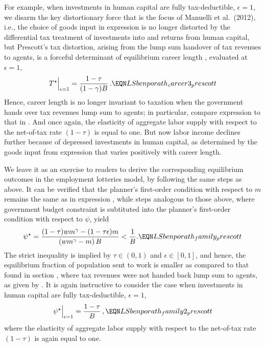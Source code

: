 For example, when investments in human capital are fully tax-deductible,
$\epsilon = 1$, we disarm the key distortionary force that is
the focus of Manuelli et al.\ (2012), i.e., the choice of goods
input in expression  is no longer
distorted by the differential tax treatment of investments into  and returns from human capital, but Prescott's tax distortion, arising from the
lump sum handover of tax revenues to agents, is a forceful determinant
of equilibrium career length ,
evaluated at $\epsilon =1$,
$$
T^{\star} \Big{\vert}_{\epsilon = 1}
 = { 1-\tau \over (1-\gamma )B }\,.
                                        \EQN LSbenporath_career3_prescott
$$
Hence, career length is no longer invariant to taxation when the
government hands over tax revenues lump sum to agents; in particular,
compare expression  to that in
. And once again, the elasticity of aggregate
labor supply with respect to the net-of-tax rate $(1-\tau )$ is equal
to one. But now labor income declines further because of
depressed investments in human capital, as determined by the goods input
from expression  that varies positively
with career length.

We leave it as an exercise to readers to derive the corresponding
equilibrium outcomes in the employment lotteries model, by following
the same steps as above. It can be verified that the planner's
first-order condition with respect to $m$ remains the same as
in expression , while steps
analogous to those above, where government budget constraint is
subtituted into the planner's first-order condition with respect
to $\psi$, yield
$$
\psi^{\star} = {(1-\tau ) w m^{\gamma} - (1-\tau \epsilon ) m \over
                (w m^{\gamma} - m)\, B } < {1 \over B}.
                                        \EQN LSbenporath_family_prescott
$$
The strict inequality is implied by $\tau \in (0,1)$ and
$\epsilon \in [0,1]$, and hence, the equilibrium fraction of
population sent to work is smaller as compared to that found in
section , where  tax
revenues were not handed back lump sum to agents, as given by
. It is again instructive to
consider the case when investments in human capital are fully
tax-deductible, $\epsilon = 1$,
$$
\psi^{\star} \Big{\vert}_{\epsilon = 1}
 = { 1-\tau \over B }\,,
                                        \EQN LSbenporath_family2_prescott
$$
where the elasticity of aggregate labor supply with respect to the
net-of-tax rate $(1-\tau )$ is again equal to one.




